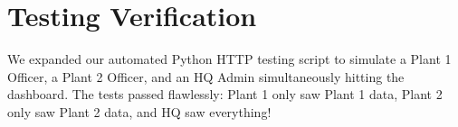\documentclass[11pt,a4paper]{article}
\begin{document}
\section{Testing Verification}
We expanded our automated Python HTTP testing script to simulate a Plant 1 Officer, a Plant 2 Officer, and an HQ Admin simultaneously hitting the dashboard. The tests passed flawlessly: Plant 1 only saw Plant 1 data, Plant 2 only saw Plant 2 data, and HQ saw everything!
\end{document}
